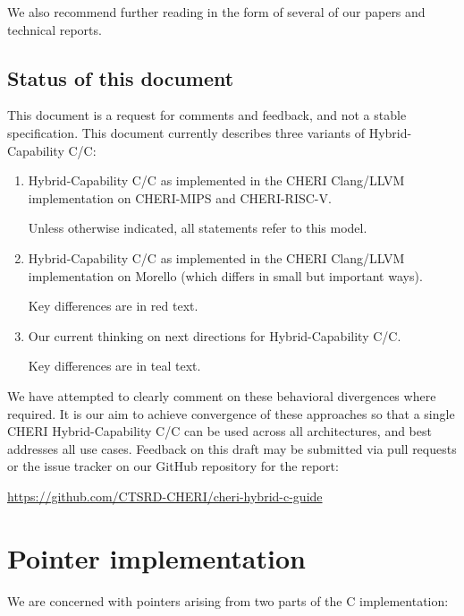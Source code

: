 \documentclass[12pt,twoside,openright,a4paper]{article}
\newcommand{\futurevariant}[1]{{\color{teal} #1}}
\newcommand{\morellovariant}[1]{{\color{red} #1}}
\newcommand*{\cpp}{\texorpdfstring{C\textsmaller[2]{\protect\nolinebreak[4]\hspace{-.05em}\raisebox{.45ex}{\textbf{++}}}}{C++}}
\newcommand*{\COrCpp}{C/\cpp{}}
\newcommand*{\hybridCOrCpp}{Hybrid-Capability \COrCpp{}}
\newcommand*{\CHERIhybridCOrCpp}{CHERI \hybridCOrCpp{}}
\begin{document}
\noindent
We also recommend further reading in the form of several of our papers and
technical reports.

\subsection{Status of this document}

This document is a request for comments and feedback, and not a stable
specification.
This document currently describes three variants of \hybridCOrCpp{}:

\begin{enumerate}
\item \hybridCOrCpp{} as implemented in the CHERI Clang/LLVM implementation on
  CHERI-MIPS and CHERI-RISC-V.

  Unless otherwise indicated, all statements refer to this model.

\item \hybridCOrCpp{} as implemented in the CHERI Clang/LLVM implementation on
  Morello (which differs in small but important ways).

  Key differences are in \morellovariant{red text}.

\item Our current thinking on next directions for \hybridCOrCpp{}.

  Key differences are in \futurevariant{teal text}.
\end{enumerate}

\noindent
We have attempted to clearly comment on these behavioral divergences where
required.
It is our aim to achieve convergence of these approaches so that a single
\CHERIhybridCOrCpp{} can be used across all architectures, and best addresses
all use cases.
Feedback on this draft may be submitted via pull requests or the issue tracker
on our GitHub repository for the report:

\smallskip

\url{https://github.com/CTSRD-CHERI/cheri-hybrid-c-guide}

\section{Pointer implementation}

We are concerned with pointers arising from two parts of the C implementation:
\end{document}
